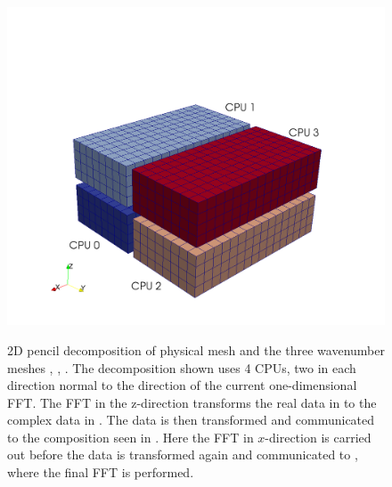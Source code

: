\documentclass[11pt, oneside]{article}
\begin{document}
\begin{figure}[t!]
{  \includegraphics[scale=0.15]{pencil3.png}
  \label{subfig2}
  }
\caption{2D pencil decomposition of physical mesh  and the three wavenumber meshes , , . The decomposition shown uses 4 CPUs, two in each direction normal to the direction of the current one-dimensional FFT. The FFT in the z-direction transforms the real data in  to the complex data in . The data is then transformed and communicated to the composition seen in . Here the FFT in $x$-direction is carried out before the data is transformed again and communicated to , where the final FFT is performed.}
\label{fig:Pencildecomp}
\end{figure}
\end{document}
